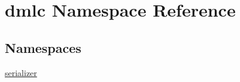 \hypertarget{namespacedmlc}{}\section{dmlc Namespace Reference}
\label{namespacedmlc}
\subsection*{Namespaces}
\begin{DoxyCompactItemize}
\item 
 \hyperlink{namespacedmlc_1_1serializer}{serializer}
\end{DoxyCompactItemize}
